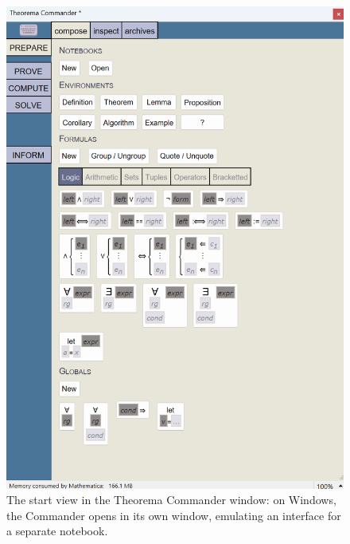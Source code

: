 \begin{figure}[h]
    \centering
    \includegraphics[scale=0.5]{images/theory/start.png}
    \caption{The start view in the Theorema Commander window: on Windows, the Commander opens in its own window, emulating an interface for a separate notebook.}
    \label{fig:start}
\end{figure}

